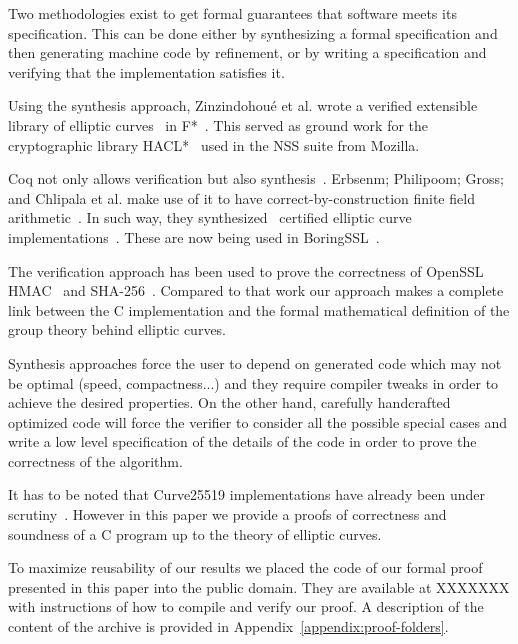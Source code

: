 Two methodologies exist to get formal guarantees that software meets its specification.
This can be done either by synthesizing a formal specification and then generating
machine code by refinement, or by writing a specification and verifying that the
implementation satisfies it.

Using the synthesis approach, Zinzindohou{\'{e}} et al. wrote a verified extensible
library of elliptic curves~\cite{Zinzindohoue2016AVE} in F*~\cite{DBLP:journals/corr/BhargavanDFHPRR17}.
This served as ground work for the cryptographic library HACL*~\cite{zinzindohoue2017hacl}
used in the NSS suite from Mozilla.

Coq not only allows verification but also synthesis~\cite{CpdtJFR}.
Erbsenm; Philipoom; Gross; and Chlipala et al. make use of it to have
correct-by-construction finite field arithmetic~\cite{Philipoom2018CorrectbyconstructionFF}.
In such way, they synthesized~\cite{Erbsen2016SystematicSO} certified elliptic curve
implementations~\cite{Erbsen2017CraftingCE}. These are now being used in
BoringSSL~\cite{fiat-crypto}.

The verification approach has been used to prove the correctness of OpenSSL
HMAC~\cite{Beringer2015VerifiedCA} and SHA-256~\cite{2015-Appel}. Compared to
that work our approach makes a complete link between the C implementation and
the formal mathematical definition of the group theory behind elliptic curves.

Synthesis approaches force the user to depend on generated code which may not
be optimal (speed, compactness...) and they require compiler tweaks in order
to achieve the desired properties. On the other hand, carefully handcrafted
optimized code will force the verifier to consider all the possible special cases
and write a low level specification of the details of the code in order to prove
the correctness of the algorithm.

It has to be noted that Curve25519 implementations have already been under scrutiny~\cite{Chen2014VerifyingCS}.
However in this paper we provide a proofs of correctness and soundness of a C program up to
the theory of elliptic curves.

To maximize reusability of our results we placed the code of our formal proof
presented in this paper into the public domain. They are available at XXXXXXX
with instructions of how to compile and verify our proof.
A description of the content of the archive is provided in
Appendix~\ref{appendix:proof-folders}.

